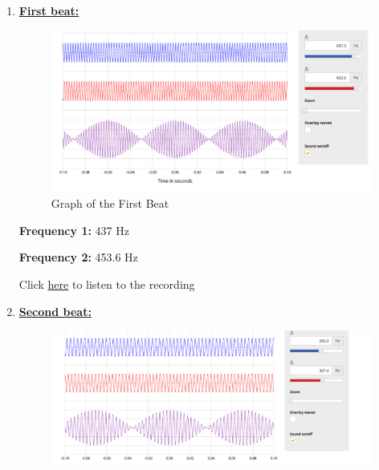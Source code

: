 \documentclass[12pt,oneside]{article}
\begin{document}
\begin{enumerate}

\item \underline{\bf First beat:}
\color{red}

\begin{figure}[H]

{\centering \includegraphics[width=15cm,]{./images/beat1} 

}

\caption{Graph of the First Beat}\label{fig:beat1}
\end{figure}

\textbf{Frequency 1:} 437 Hz

\par

\textbf{Frequency 2:} 453.6 Hz

\par

Click
\href{https://drive.google.com/file/d/1oXFQMKwtDi49notKpu_14QgbBMQKakrs/view?usp=sharing}{here}
to listen to the recording

\color{black}
\item \underline{\bf Second beat:}
\color{red}

\begin{figure}[H]

{\centering \includegraphics[width=15cm,]{./images/beat2} 

}
\end{figure}
\end{enumerate}
\end{document}
